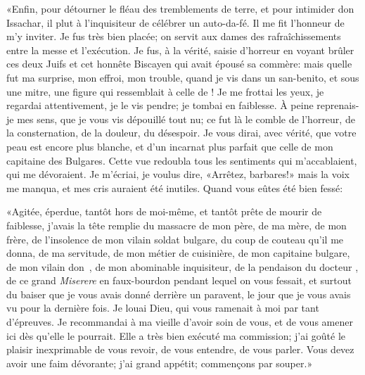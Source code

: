 «Enfin, pour détourner le fléau des tremblements de terre, et pour
intimider don Issachar, il plut à  l’inquisiteur de célébrer
un auto-da-fé. Il me fit l’honneur de m’y inviter. Je fus très bien
placée; on servit aux dames des rafraîchissements entre la messe et
l’exécution. Je fus, à la vérité, saisie d’horreur en voyant brûler ces
deux Juifs et cet honnête Biscayen qui avait épousé sa commère: mais
quelle fut ma surprise, mon effroi, mon trouble, quand je vis dans un
san-benito,
 et sous une mitre, une figure qui ressemblait à celle de
! Je me 
frottai les yeux, je regardai attentivement, je le vis
pendre; je tombai en faiblesse. À peine reprenais-je mes sens, que je
vous vis dépouillé tout nu; ce fut là le comble de l’horreur, de la
consternation, de la douleur, du désespoir. Je vous dirai, avec vérité,
que votre peau est encore plus blanche, et d’un incarnat plus parfait
que celle de mon capitaine des Bulgares. Cette vue redoubla tous les
sentiments qui m’accablaient, qui me dévoraient. Je m’écriai, je voulus
dire, «Arrêtez, barbares!» mais la voix me manqua, et mes cris auraient
été inutiles. Quand vous eûtes été bien fessé: \localleftbox{}

«Agitée, éperdue, tantôt hors de moi-même, et tantôt prête de mourir de
faiblesse, j’avais la tête remplie du massacre de mon père, de ma mère,
de mon frère, de l’insolence de mon vilain soldat bulgare, du coup de
couteau qu’il me donna, de ma servitude, de mon métier de cuisinière,
de mon capitaine bulgare, de mon vilain don~, de mon abominable
inquisiteur, de la pendaison du docteur , de ce grand \emph{Miserere}
en faux-bourdon pendant lequel on vous fessait, et surtout du baiser
que je vous avais donné derrière un paravent, le jour que je vous avais
vu pour la dernière fois. Je louai Dieu, qui vous ramenait à moi par
tant d’épreuves. Je recommandai à ma vieille d’avoir soin de vous, et
de vous amener ici dès qu’elle le pourrait. Elle a très bien exécuté ma
commission; j’ai goûté le plaisir inexprimable de vous revoir, de vous
entendre, de vous parler. Vous devez avoir une faim dévorante; j’ai
grand appétit; commençons par souper.»


